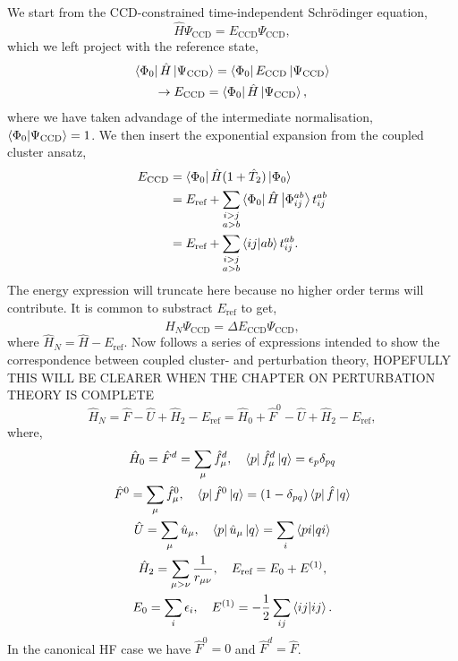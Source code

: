 We start from the CCD-constrained time-independent Schrödinger equation,
\begin{equation}
    \hat{H}\Psi_{\text{CCD}} = E_{\text{CCD}} \Psi_{\text{CCD}},
\end{equation}
which we left project with the reference state,
\begin{gather*}
    \bra{\Phi_0} \hat{H} \ket{\Psi_{\text{CCD}}} = \bra{\Phi_0} E_{\text{CCD}} \ket{\Psi_{\text{CCD}}} \nonumber \\
    \to E_{\text{CCD}} = \bra{\Phi_0} \hat{H} \ket{\Psi_{\text{CCD}}},
\end{gather*}
where we have taken advandage of the intermediate normalisation, 
$\braket{\Phi_0}{\Psi_{\text{CCD}}} = 1$. We then insert the exponential expansion
from the coupled cluster ansatz,
\begin{equation}
    \label{eq:ccd_energy}
    \begin{aligned}
    E_{\text{CCD}} &= \bra{\Phi_0} \hat{H} (1 + \hat{T}_2)\ket{\Phi_0} \\
        &= E_{\text{ref}} 
        + \sum_{\substack{i>j \\ a>b}} \bra{\Phi_0} \hat{H} \ket{\Phi_{ij}^{ab}}t^{ab}_{ij} \\
        &= E_{\text{ref}}
        + \sum_{\substack{i>j \\ a>b}} \bra{ij} \ket{ab}t^{ab}_{ij}.
    \end{aligned}
\end{equation}
The energy expression will truncate here because no higher order terms will contribute.
It is common to substract $E_{\text{ref}}$ to get,
\begin{equation}
    \hat{H}_N \Psi_{\text{CCD}} = \Delta E_{\text{CCD}} \Psi_{\text{CCD}},
\end{equation}
where $\hat{H}_N = \hat{H} - E_{\text{ref}}$. Now follows a series of expressions
intended to show the correspondence between coupled cluster- and perturbation theory,
HOPEFULLY THIS WILL BE CLEARER WHEN THE CHAPTER ON PERTURBATION THEORY IS COMPLETE
\begin{equation}
    \hat{H}_N = \hat{F} - \hat{U} + \hat{H}_2 - E_{\text{ref}}
        = \hat{H}_0 + \hat{F}^0 - \hat{U} + \hat{H}_2 - E_{\text{ref}},
\end{equation}
where,
\begin{gather}
    \hat{H}_0 = \hat{F}^d = \sum_\mu \hat{f}_\mu^d, 
        \quad \bra{p} \hat{f}_\mu^d \ket{q} = \epsilon_p \delta_{pq} \\
    \hat{F}^0 = \sum_\mu \hat{f}^0_\mu,
        \quad \bra{p} \hat{f}^0 \ket{q} = (1 - \delta_{pq})\bra{p} \hat{f} \ket{q} \\
    \hat{U} = \sum_\mu \hat{u}_\mu, 
        \quad \bra{p} \hat{u}_\mu \ket{q} = \sum_i \bra{pi} \ket{qi} \\
    \hat{H}_2 = \sum_{\mu > \nu} \frac{1}{r_{\mu\nu}},
        \quad E_{\text{ref}} = E_0 + E^{(1)}, \\
    E_0  = \sum_i \epsilon_i, \quad E^{(1)} = - \frac{1}{2} \sum_{ij} \bra{ij} \ket{ij}.
\end{gather}
In the canonical HF case we have $\hat{F}^0 = 0$ and $\hat{F}^d = \hat{F}$.

